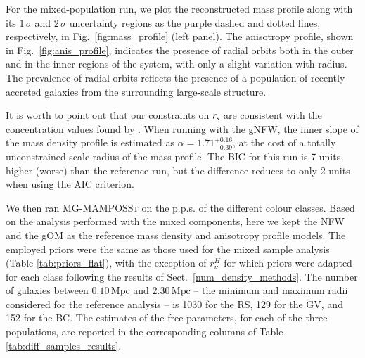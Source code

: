 \documentclass{aa}
\begin{document}
For the mixed-population run, we plot the reconstructed mass profile along with its $1\,\sigma$ and $2\,\sigma$ uncertainty regions as the purple dashed and dotted lines, respectively, in Fig.~\ref{fig:mass_profile} (left panel). The anisotropy profile, shown in Fig.~\ref{fig:anis_profile}, indicates the presence of radial orbits both in the outer and in the inner regions of the system, %
 with only a slight variation with radius. %
The prevalence of radial orbits reflects 
the presence of a population of recently accreted galaxies from the surrounding large-scale structure.

It is worth to point out that our constraints on $r_{\rm s}$ are consistent with the concentration values found by \citet{Gavazzi_2009}.
When running with the gNFW, the inner slope of the mass density profile is estimated as $\alpha=1.71_{-0.39}^{+0.16}$, at the cost of a totally unconstrained scale radius of the mass profile. The BIC for this run is 7 units higher (worse) than the reference run, but the difference reduces to only 2 units when using the AIC criterion.

We then ran \textsc{MG-MAMPOSSt} on the p.p.s. of the different colour classes. Based on the analysis performed with the mixed components, here we kept the NFW and the gOM as the reference mass density and anisotropy profile models. The employed priors were the same as those used for the mixed sample analysis (Table \ref{tab:priors_flat}), with the exception of $r_\nu^H$ for which priors were adapted for each class following the results of Sect.~\ref{num_density_methods}. The number of galaxies between $0.10 \,\mathrm{Mpc}$ and $2.30 \,\mathrm{Mpc}$ -- the minimum and maximum radii considered for the reference analysis -- is 1030 for the RS, 129 for the GV, and 152 for the BC. The estimates of the free parameters, for each of the three populations, are reported in the corresponding columns of Table \ref{tab:diff_samples_results}. 
\end{document}
